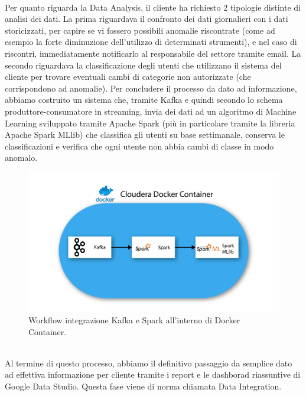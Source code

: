 \\
Per quanto riguarda la Data Analysis, il cliente ha richiesto 2 tipologie distinte di analisi dei dati.
La prima riguardava il confronto dei dati giornalieri con i dati storicizzati, per capire se vi fossero possibili anomalie riscontrate (come ad esempio la forte diminuzione dell'utilizzo di determinati strumenti), e nel caso di riscontri, immediatamente notificarlo al responsabile del settore tramite email.
La secondo riguardava la classificazione degli utenti che utilizzano il sistema del cliente per trovare eventuali cambi di categorie non autorizzate (che corrispondono ad anomalie). Per concludere il processo da dato ad informazione, abbiamo costruito un sistema che, tramite Kafka e quindi secondo lo schema produttore-consumatore in streaming, invia dei dati ad un algoritmo di Machine Learning sviluppato tramite Apache Spark (più in particolare tramite la libreria Apache Spark MLlib) che classifica gli utenti su base settimanale, conserva le classificazioni e verifica che ogni utente non abbia cambi di classe in modo anomalo.
\begin{figure}[h!]
	\centering
	\includegraphics[scale=0.5]{figures/kafka_spark}
	\caption[Workflow progetto	.]{Workflow integrazione Kafka e Spark all'interno di Docker Container.
		\label{fig:logoGCP}}
\end{figure}	
\\
Al termine di questo processo, abbiamo il definitivo passaggio da semplice dato ad effettiva informazione per cliente tramite i report e le dashborad riassuntive di Google Data Studio. Questa fase viene di norma chiamata Data Integration.

